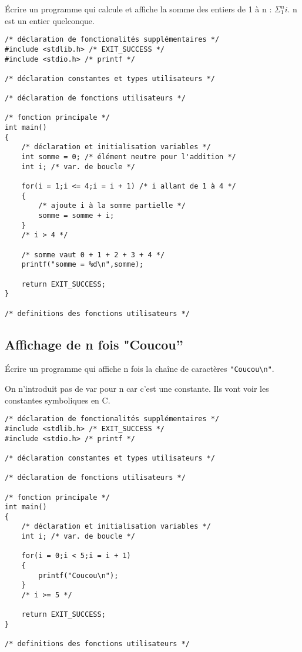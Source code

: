Écrire un programme qui calcule et affiche la somme des entiers de 1 à
n : $\Sigma_1^n i$. n est un entier quelconque. 

\begin{correction}

\begin{verbatim}
/* déclaration de fonctionalités supplémentaires */
#include <stdlib.h> /* EXIT_SUCCESS */
#include <stdio.h> /* printf */

/* déclaration constantes et types utilisateurs */

/* déclaration de fonctions utilisateurs */

/* fonction principale */
int main()
{
    /* déclaration et initialisation variables */
    int somme = 0; /* élément neutre pour l'addition */
    int i; /* var. de boucle */

    for(i = 1;i <= 4;i = i + 1) /* i allant de 1 à 4 */
    {
        /* ajoute i à la somme partielle */
        somme = somme + i;
    }
    /* i > 4 */

    /* somme vaut 0 + 1 + 2 + 3 + 4 */
    printf("somme = %d\n",somme);

    return EXIT_SUCCESS;
}

/* definitions des fonctions utilisateurs */
\end{verbatim}
\end{correction}

\subsection{Affichage de n fois "Coucou''}

Écrire un programme qui affiche n fois la chaîne de caractères \verb|"Coucou\n"|.

\begin{correction}
On n'introduit pas de var pour n car c'est une constante. Ils vont
voir les constantes symboliques en C. 
\begin{verbatim}
/* déclaration de fonctionalités supplémentaires */
#include <stdlib.h> /* EXIT_SUCCESS */
#include <stdio.h> /* printf */

/* déclaration constantes et types utilisateurs */

/* déclaration de fonctions utilisateurs */

/* fonction principale */
int main()
{
    /* déclaration et initialisation variables */
    int i; /* var. de boucle */

    for(i = 0;i < 5;i = i + 1)
    {
        printf("Coucou\n");
    }
    /* i >= 5 */

    return EXIT_SUCCESS;
}

/* definitions des fonctions utilisateurs */
\end{verbatim}
\end{correction}


